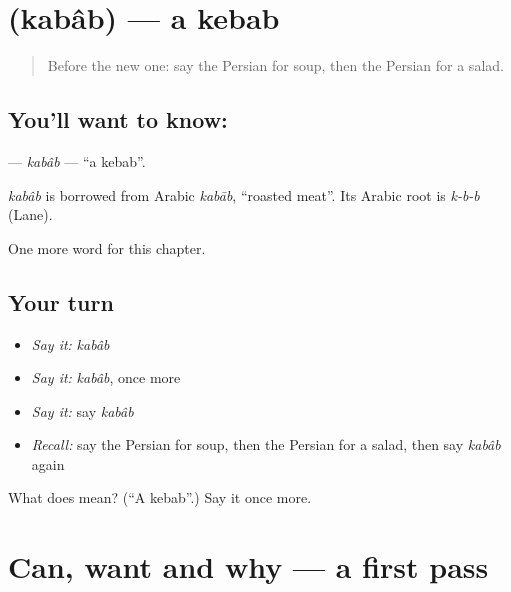 \section[\texorpdfstring{\fa{کباب} (kabâb)}{کباب (kabâb)}]{ (kabâb) — a kebab}

\label{lesson:FA-C98-kabab}



\begin{quote}
Before the new one: say the Persian for soup, then the Persian for a salad.
\end{quote}

\subsection*{You'll want to know: }
\textbf{} — \emph{kabâb} — \textquotedblleft{}a kebab\textquotedblright{}.

\begin{cousinweb}
\emph{kabâb} is borrowed from Arabic \emph{kabāb}, \textquotedblleft{}roasted meat\textquotedblright{}. Its Arabic root is \emph{k-b-b} (Lane).
\end{cousinweb}

\begin{grammarlens}[title={What you've built}]
One more word for this chapter.
\end{grammarlens}

\subsection*{Your turn}
\begin{itemize}
\raggedright
  \item \emph{Say it:} \emph{kabâb}
  \item \emph{Say it:} \emph{kabâb}, once more
  \item \emph{Say it:} say \emph{kabâb}
  \item \emph{Recall:} say the Persian for soup, then the Persian for a salad, then say \emph{kabâb} again
\end{itemize}

\begin{tcolorbox}[breakable,colback=teal!4,colframe=teal!35!black,title={Before you move on}]
What does  mean? (\textquotedblleft{}A kebab\textquotedblright{}.) Say it once more.
\end{tcolorbox}
\section[(dialogue)]{Can, want and why — a first pass}

